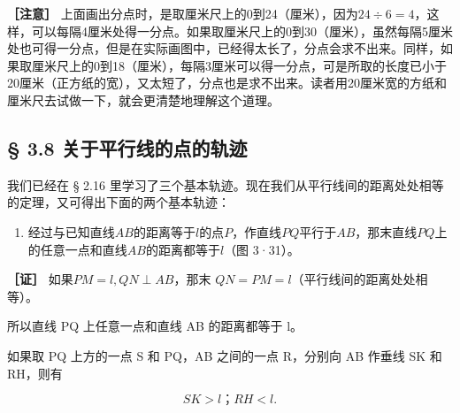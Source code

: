 \textbf{［注意］}
上面画出分点时，是取厘米尺上的0到24（厘米），因为\(24\div6=4\)，这样，可以每隔4厘米处得一分点。如果取厘米尺上的0到30（厘米），虽然每隔5厘米处也可得一分点，但是在实际画图中，已经得太长了，分点会求不出来。同样，如果取厘米尺上的0到18（厘米），每隔3厘米可以得一分点，可是所取的长度已小于20厘米（正方纸的宽），又太短了，分点也是求不出来。读者用20厘米宽的方纸和厘米尺去试做一下，就会更清楚地理解这个道理。

\subsection{§ 3.8
关于平行线的点的轨迹}

我们已经在 § 2.16
里学习了三个基本轨迹。现在我们从平行线间的距离处处相等的定理，又可得出下面的两个基本轨迹：

\begin{enumerate}
\item
  经过与已知直线\(AB\)的距离等于\(l\)的点\(P\)，作直线\(PQ\)平行于\(AB\)，那末直线\(PQ\)上的任意一点和直线\(AB\)的距离都等于\(l\)（图
  3·31）。
\end{enumerate}

\textbf{［证］} 如果\(PM = l, QN \perp AB\)，那末
\(QN = PM = l\)（平行线间的距离处处相等）。

所以直线 PQ 上任意一点和直线 AB 的距离都等于 l。

如果取 PQ 上方的一点 S 和 PQ，AB 之间的一点 R，分别向 AB 作垂线 SK 和
RH，则有

\[
SK > l\text{；} RH < l.
\]

